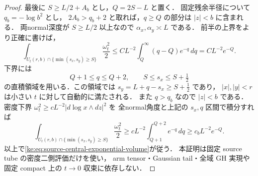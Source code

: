 \begin{proof}
最後に $S\ge L/2+A_b$ とし，$Q=2S-L$ と置く．
固定残余半径について $q_b=-\log b^2$ とし，
$2A_b>q_b+2$ と取れば，$q\ge Q$ の部分は $|z|<b$ に含まれる．
両normal深度が $S\ge L/2$ 以上なので
$\alpha_x,\alpha_y\asymp L$ である．
前半の上界をより正確に書けば，
\[
 \int_{U_t(r,b)\cap\{\min(s_x,s_y)\ge S\}}
 \frac{\omega_t^2}{2}
 \le CL^{-2}\int_Q^\infty(q-Q)e^{-q}\,dq
 =CL^{-2}e^{-Q}.
\]
下界には
\[
 Q+1\le q\le Q+2,\qquad S\le s_x\le S+\tfrac12
\]
の直積領域を用いる．この領域では
$s_y=L+q-s_x\ge S+\tfrac12$ であり，
$|x|,|y|<r$ は小さい $t$ に対して自動的に満たされる．
また $q>q_b$ なので $|z|<b$ である．
密度下界 $\omega_t^2\ge cL^{-2}|d\log x\wedge dz|^2$ を
全normal角度と上記の $s_x,q$ 区間で積分すれば
\[
 \int_{U_t(r,b)\cap\{\min(s_x,s_y)\ge S\}}
 \frac{\omega_t^2}{2}
 \ge cL^{-2}\int_{Q+1}^{Q+2}e^{-q}\,dq
 \ge c_bL^{-2}e^{-Q}.
\]
以上で\eqref{ke:eq:source-central-exponential-volume}が従う．
本証明は固定 source tube の密度二側評価だけを使い，
arm tensor・Gaussian tail・全域 GH 実現や
固定 compact 上の $t\to0$ 収束に依存しない．
\end{proof}

